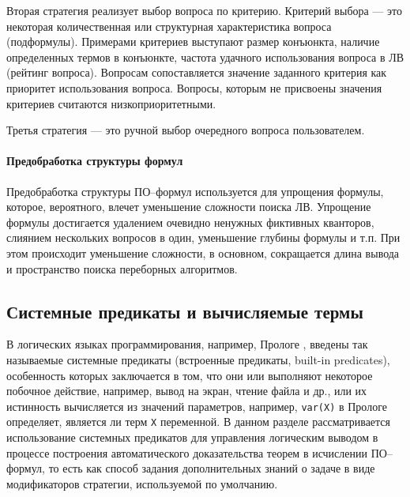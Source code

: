 Вторая стратегия реализует выбор вопроса по критерию. Критерий выбора --- это некоторая количественная или структурная характеристика вопроса (подформулы). Примерами критериев выступают размер конъюнкта, наличие определенных термов в конъюнкте, частота удачного использования вопроса в ЛВ (рейтинг вопроса). Вопросам сопоставляется значение заданного критерия как приоритет использования вопроса. Вопросы, которым не присвоены значения критериев считаются низкоприоритетными. %

Третья стратегия --- это ручной выбор очередного вопроса пользователем.

\paragraph{Предобработка структуры формул}
Предобработка структуры ПО--формул используется для упрощения формулы, которое, вероятного, влечет уменьшение сложности поиска ЛВ. Упрощение формулы достигается удалением очевидно ненужных фиктивных кванторов, слиянием нескольких вопросов в один, уменьшение глубины формулы и т.п. При этом происходит уменьшение сложности, в основном, сокращается длина вывода и пространство поиска переборных алгоритмов.


\subsection{Системные предикаты и вычисляемые термы}
В логических языках программирования, например, Прологе \cite{Bratko}, введены так называемые системные предикаты (встроенные предикаты, built-in predicates), особенность которых заключается в том, что они или выполняют некоторое побочное действие, например, вывод на экран, чтение файла и др., или их истинность вычисляется из значений параметров, например, \texttt{var(X)} в Прологе определяет, является ли терм \texttt{X} переменной. В данном разделе рассматривается использование системных предикатов для управления логическим выводом в процессе построения автоматического доказательства теорем в исчислении ПО--формул, то есть как способ задания дополнительных знаний о задаче в виде модификаторов стратегии, используемой по умолчанию.

